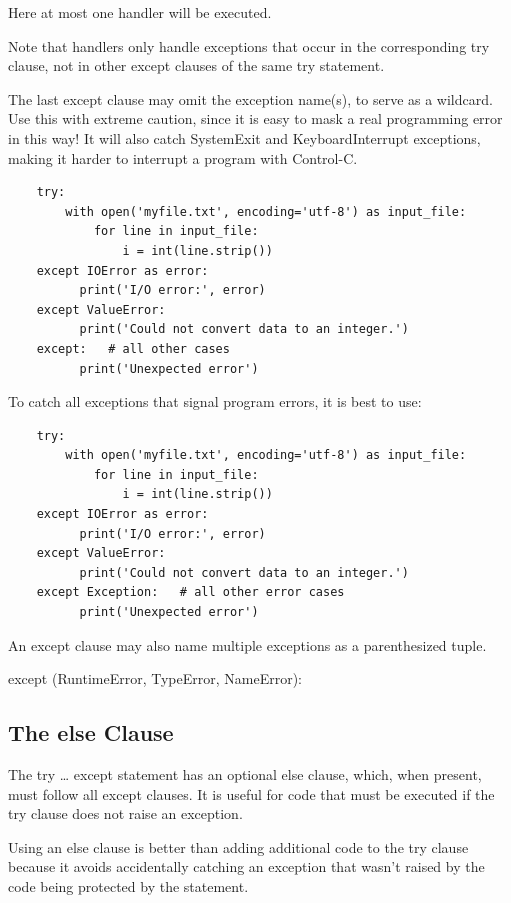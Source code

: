 \documentclass{article}
\begin{document}
Here at most one handler will be executed.

Note that handlers only handle exceptions that occur in the corresponding try clause, not in other except clauses of the same try statement. 

The last except clause may omit the exception name(s), to serve as a wildcard. Use this with extreme caution, since it is easy to mask a real programming error in this way!  It will also catch SystemExit and KeyboardInterrupt exceptions, making it harder to interrupt a program with Control-C.

\begin{lstlisting}
    try:
        with open('myfile.txt', encoding='utf-8') as input_file:
            for line in input_file:
                i = int(line.strip())
    except IOError as error:
          print('I/O error:', error)
    except ValueError:
          print('Could not convert data to an integer.')
    except:   # all other cases
          print('Unexpected error')
\end{lstlisting}
 
To catch all exceptions that signal program errors, it is best to use: 
\begin{lstlisting}
    try:
        with open('myfile.txt', encoding='utf-8') as input_file:
            for line in input_file:
                i = int(line.strip())
    except IOError as error:
          print('I/O error:', error)
    except ValueError:
          print('Could not convert data to an integer.')
    except Exception:   # all other error cases
          print('Unexpected error')
\end{lstlisting}

An except clause may also name multiple exceptions as a parenthesized tuple.

except (RuntimeError, TypeError, NameError): 

\subsection{The else Clause}

The try … except statement has an optional else clause, which, when present, must follow all except clauses.   It is useful for code that must be executed if the try clause does not raise an exception. 

Using an else clause is better than adding additional code to the try clause because it avoids accidentally catching an exception that wasn’t raised by the code being protected by the statement.
\end{document}
